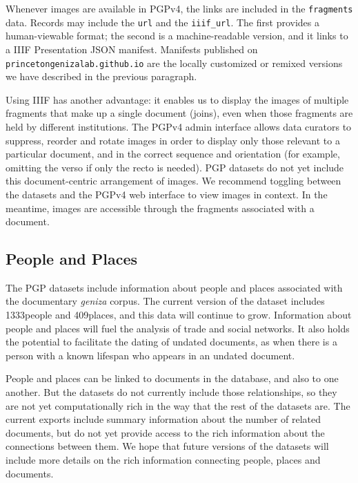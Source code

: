 \documentclass{article}
\def\totalPeopleRecords{1333}
\def\totalPlaceRecords{409}
\begin{document}
Whenever images are available in PGPv4, the links are included in the \texttt{fragments} data. Records may include the \texttt{url} and the \texttt{iiif\_url}. The first provides a human-viewable format; the second is a machine-readable version, and it links to a IIIF Presentation JSON manifest. Manifests published on \texttt{princetongenizalab.github.io} are the locally customized or remixed versions we have described in the previous paragraph.

Using IIIF has another advantage: it enables us to display the images of multiple fragments that make up a single document (joins), even when those fragments are held by different institutions. The PGPv4 admin interface allows data curators to suppress, reorder and rotate images in order to display only those relevant to a particular document, and in the correct sequence and orientation (for example, omitting the verso if only the recto is needed). PGP datasets do not yet include this document-centric arrangement of images. We recommend toggling between the datasets and the PGPv4 web interface to view images in context. In the meantime, images are accessible through the fragments associated with a document.

\subsection{People and Places}

The PGP datasets include information about people and places associated with the documentary \textit{geniza }corpus. The current version of the dataset includes \totalPeopleRecords\space people and \totalPlaceRecords\space places, and this data will continue to grow. Information about people and places will fuel the analysis of trade and social networks. It also holds the potential to facilitate the dating of undated documents, as when there is a person with a known lifespan who appears in an undated document. 

People and places can be linked to documents in the database, and also to one another. But the datasets do not currently include those relationships, so they are not yet computationally rich in the way that the rest of the datasets are. The current exports include summary information about the number of related documents, but do not yet provide access to the rich information about the connections between them. We hope that future versions of the datasets will include more details on the rich information connecting people, places and documents.
\end{document}
